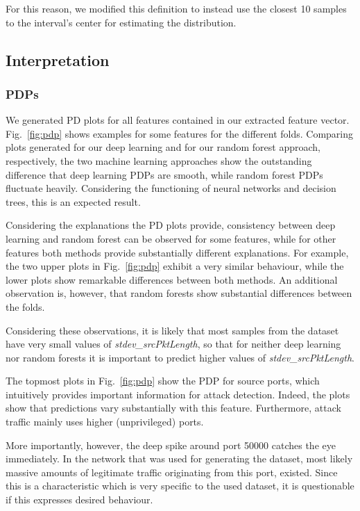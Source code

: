 \documentclass[sigconf,nonacm]{acmart}
\begin{document}
For this reason, we modified this definition to instead use the closest 10 samples to the interval's center for estimating the distribution.

\subsection{Interpretation}
\subsubsection{PDPs}
We generated PD plots for all features contained in our extracted feature vector. Fig.~\ref{fig:pdp} shows examples for some features for the different folds. Comparing plots generated for our deep learning and for our random forest approach, respectively, the two machine learning approaches show the outstanding difference that deep learning PDPs are smooth, while random forest PDPs fluctuate heavily. Considering the functioning of neural networks and decision trees, this is an expected result.

Considering the explanations the PD plots provide, consistency between deep learning and random forest can be observed for some features, while for other features both methods provide substantially different explanations. For example, the two upper plots in Fig.~\ref{fig:pdp} exhibit a very similar behaviour, while the lower plots show remarkable differences between both methods. An additional observation is, however, that random forests show substantial differences between the folds. 

Considering these observations, it is likely that most samples from the dataset have very small values of \textit{stdev\_srcPktLength}, so that for neither deep learning nor random forests it is important to predict higher values of \textit{stdev\_srcPktLength}. 

The topmost plots in Fig.~\ref{fig:pdp} show the PDP for source ports, which intuitively provides important information for attack detection. Indeed, the plots show that predictions vary substantially with this feature. Furthermore, attack traffic mainly uses higher (unprivileged) ports.

More importantly, however, the deep spike around port 50000 catches the eye immediately. In the network that was used for generating the dataset, most likely massive amounts of legitimate traffic originating from this port, existed.
Since this is a characteristic which is very specific to the used dataset, it is questionable if this expresses desired behaviour.
\end{document}

